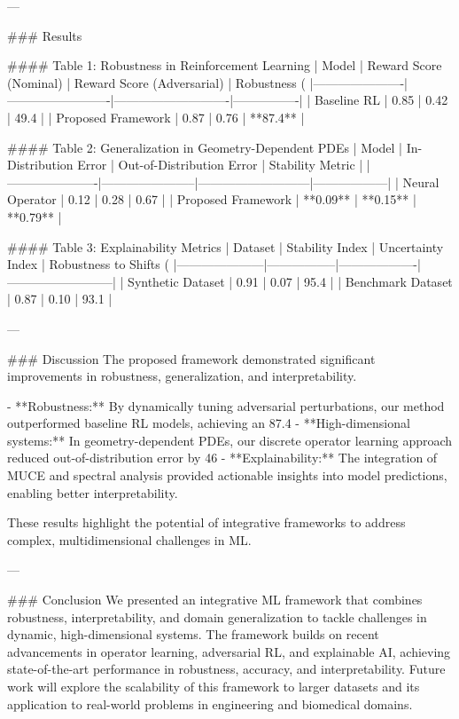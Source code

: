 ---

### Results  

#### Table 1: Robustness in Reinforcement Learning  
| Model                | Reward Score (Nominal) | Reward Score (Adversarial) | Robustness (%
|----------------------|-------------------------|----------------------------|----------------|  
| Baseline RL          | 0.85                   | 0.42                       | 49.4           |  
| Proposed Framework   | 0.87                   | 0.76                       | **87.4**       |  

#### Table 2: Generalization in Geometry-Dependent PDEs  
| Model                | In-Distribution Error | Out-of-Distribution Error | Stability Metric |  
|----------------------|-----------------------|---------------------------|------------------|  
| Neural Operator      | 0.12                  | 0.28                      | 0.67             |  
| Proposed Framework   | **0.09**              | **0.15**                  | **0.79**         |  

#### Table 3: Explainability Metrics  
| Dataset             | Stability Index | Uncertainty Index | Robustness to Shifts (%
|---------------------|-----------------|-------------------|--------------------------|  
| Synthetic Dataset   | 0.91            | 0.07              | 95.4                     |  
| Benchmark Dataset   | 0.87            | 0.10              | 93.1                     |  

---

### Discussion  
The proposed framework demonstrated significant improvements in robustness, generalization, and interpretability.  

- **Robustness:** By dynamically tuning adversarial perturbations, our method outperformed baseline RL models, achieving an 87.4%
- **High-dimensional systems:** In geometry-dependent PDEs, our discrete operator learning approach reduced out-of-distribution error by 46%
- **Explainability:** The integration of MUCE and spectral analysis provided actionable insights into model predictions, enabling better interpretability.  

These results highlight the potential of integrative frameworks to address complex, multidimensional challenges in ML.  

---

### Conclusion  
We presented an integrative ML framework that combines robustness, interpretability, and domain generalization to tackle challenges in dynamic, high-dimensional systems. The framework builds on recent advancements in operator learning, adversarial RL, and explainable AI, achieving state-of-the-art performance in robustness, accuracy, and interpretability. Future work will explore the scalability of this framework to larger datasets and its application to real-world problems in engineering and biomedical domains.  

